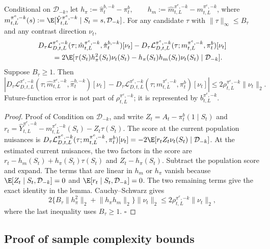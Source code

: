\documentclass[opre,nonblindrev]{informs4}
\providecommand{\cD}{\mathcal D}
\newcommand{\norm}[1]{\lVert#1\rVert}
\newcommand{\blipadv}{\tau}
\newcommand{\boundadv}{B_\blipadv}
\renewcommand{\qed}{\unskip\nobreak\hfill\ensuremath{\square}}
\begin{document}
\begin{lemma}
\label{lemma-secondorderderivatives}
Conditional on $\cD_{-k}$, let
$
h_\pi:=\hat\pi_t^{b,-k}-\pi_t^b,
\qquad
h_m:=\hat m_{t,L}^{\pi^e,-k}-m_{t,L}^{\pi^e,-k}$,
where
$
m_{t,L}^{\pi^e,-k}(s)
:=\E[\hat Y_{t,L}^{\pi^e,-k}\mid S_t=s,\cD_{-k}]$.
For any candidate $\blipadv$ with $\norm{\blipadv}_\infty\leq\boundadv$
and any contrast direction $\nu_t$,
\begin{align*}
&D_{\blipadv}\mathcal L_{D,t,L}^{\pi^e,-k}
(\blipadv;\hat m_{t,L}^{\pi^e,-k},\hat\pi_t^{b,-k})[\nu_t]
-D_{\blipadv}\mathcal L_{D,t,L}^{\pi^e,-k}
(\blipadv;m_{t,L}^{\pi^e,-k},\pi_t^b)[\nu_t]\\
&\qquad=2\E[\blipadv(S_t)h_\pi^2(S_t)\nu_t(S_t)
-h_\pi(S_t)h_m(S_t)\nu_t(S_t)\mid\cD_{-k}].
\end{align*}
Suppose $\boundadv\geq1$. Then
\[
\left|
D_{\blipadv}\mathcal L_{D,t,L}^{\pi^e,-k}
(\blipadv;\hat m_{t,L}^{\pi^e,-k},\hat\pi_t^{b,-k})[\nu_t]
-D_{\blipadv}\mathcal L_{D,t,L}^{\pi^e,-k}
(\blipadv;m_{t,L}^{\pi^e,-k},\pi_t^b)[\nu_t]
\right|
\leq2\rho_{t,L}^{\pi^e,-k}\norm{\nu_t}_2.
\]
Future-function error is not part of $\rho_{t,L}^{\pi^e,-k}$; it is
represented by $b_{t,L}^{\pi^e,-k}$.
\end{lemma}
\begin{proof}{Proof of }
Condition on $\cD_{-k}$, and write
$Z_t=A_t-\pi_t^b(1\mid S_t)$ and
$
r_t=\hat Y_{t,L}^{\pi^e,-k}-m_{t,L}^{\pi^e,-k}(S_t)
-Z_t\blipadv(S_t)$.
The score at the current population nuisances is
$D_{\blipadv}\mathcal L_{D,t,L}^{\pi^e,-k}
(\blipadv;m_{t,L}^{\pi^e,-k},\pi_t^b)[\nu_t]
=-2\E[r_tZ_t\nu_t(S_t)\mid\cD_{-k}]$.
At the estimated current nuisances, the two factors in the score are
$r_t-h_m(S_t)+h_\pi(S_t)\blipadv(S_t)$ and
$Z_t-h_\pi(S_t)$. Subtract the population score and expand. The terms that
are linear in $h_m$ or $h_\pi$ vanish because
$\E[Z_t\mid S_t,\cD_{-k}]=0$ and
$\E[r_t\mid S_t,\cD_{-k}]=0$. The two remaining terms give the exact
identity in the lemma. Cauchy--Schwarz gives
\[
2\{\boundadv\norm{h_\pi^2}_2+\norm{h_\pi h_m}_2\}\norm{\nu_t}_2
\leq2\rho_{t,L}^{\pi^e,-k}\norm{\nu_t}_2,
\]
where the last inequality uses $\boundadv\geq1$. \qed
\end{proof}

\subsection{Proof of sample complexity bounds}
\end{document}

